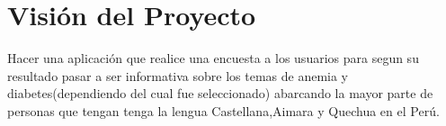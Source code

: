 \chapter{Visión del Proyecto}
Hacer una aplicación que realice una encuesta a los usuarios para segun su resultado pasar a ser  informativa sobre los temas de anemia
y diabetes(dependiendo del cual fue seleccionado) abarcando la mayor parte de personas que tengan
tenga la lengua Castellana,Aimara y Quechua en el Perú.